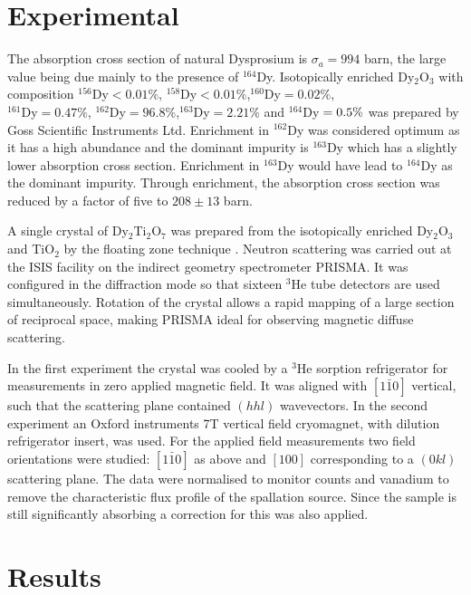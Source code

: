 \documentclass[global,twocolumn]{svjour}
\begin{document}
\section{Experimental}
\label{exp}
The absorption cross section of natural Dysprosium is $\sigma_a = 994$ barn, 
the large value being 
due mainly to the presence of $^{164}$Dy.
Isotopically enriched Dy$_2$O$_3$ with composition
$^{156}$Dy$ < 0.01 \%$,
$^{158}$Dy$ < 0.01 \%$,$^{160}$Dy$ = 0.02 \%$,\\$^{161}$Dy$ = 0.47 \%$,
$^{162}$Dy$=  96.8 \%$,$^{163}$Dy$ = 2.21 \%$ and $^{164}$Dy$\\ = 0.5 \%$ was 
prepared by Goss Scientific Instruments Ltd.  
Enrichment in  $^{162}$Dy was considered optimum as it has a high abundance 
and the dominant impurity is $^{163}$Dy which has a slightly lower absorption cross section.  Enrichment in $^{163}$Dy would have lead to $^{164}$Dy as the dominant impurity.  Through enrichment, the absorption cross section was reduced by a factor of five to $208 \pm 13$ barn.

A single crystal of Dy$_2$Ti$_2$O$_7$ was prepared from the isotopically
enriched Dy$_2$O$_3$ and TiO$_2$ by the floating zone technique \cite{don}.
Neutron scattering was
carried out at the ISIS facility on the indirect geometry spectrometer PRISMA. It was configured in the 
diffraction mode so that 
sixteen $^3$He tube detectors are used simultaneously. 
Rotation of the crystal allows a rapid mapping of a
large section of reciprocal space, making PRISMA ideal for observing
magnetic diffuse scattering.

In the first experiment the crystal was cooled by a $^3$He sorption
refrigerator for measurements in zero applied magnetic field. It was 
aligned with $[1\bar{1}0]$ vertical, such
that the scattering plane contained $(hhl)$ wavevectors.
In the second experiment an Oxford instruments 7T 
vertical field cryomagnet, with dilution refrigerator
insert, was used. For the applied field measurements
two field orientations were studied: $[1\bar{1}0]$ as above and $[100]$
corresponding to a $(0kl)$ scattering plane. 
The data were normalised to monitor counts and vanadium to remove the 
characteristic flux profile of the spallation source.  Since the sample 
is still significantly absorbing a correction for this was also applied.

\section{Results}
\label{res}
\end{document}
